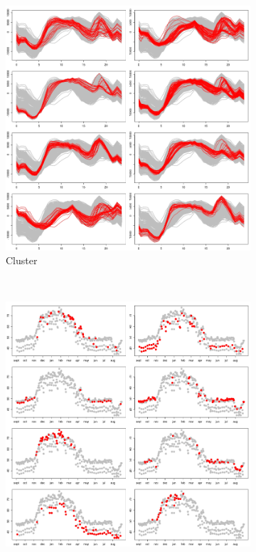 \documentclass[xcolor=dvipsnames, smaller]{beamer}
\begin{document}
\begin{frame}
\begin{figure} \centering
  \begin{subfigure}[t]{0.45\textwidth}
    \includegraphics[width=\textwidth]{./pics/conso_AC-curves.png}
    \caption{Cluster}
  \end{subfigure}
  ~  	
  \begin{subfigure}[t]{0.45\textwidth}
    \includegraphics[width=\textwidth]{./pics/conso_AC-calendar.png}

\end{subfigure}
\end{figure}
\end{frame}
\end{document}
